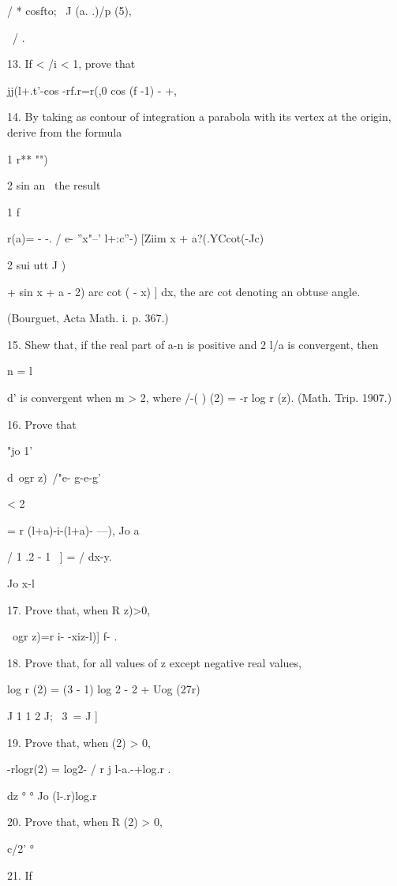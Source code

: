 / * cosfto; \ J (a. .)/p (5), 

\ / .

13. If < /i < 1, prove that

jj(l+.t'-cos -rf.r=r(,0 cos (f -1) - +,


14. By taking as contour of integration a parabola with its vertex at
the origin, derive from the formula

1 r** "")

2 sin an \ the result

1 f

r(a)= - -. / e- ''x"--' l+:c''-) [Ziim x + a?(.YCcot(-Jc)

2 sui utt J )

+ sin x + a - 2) arc cot ( - x) ] dx, the arc cot denoting an obtuse
angle.

(Bourguet, Acta Math. i. p. 367.)

15. Shew that, if the real part of a-n is positive and 2 l/a is
convergent, then

n = l

d' is convergent when m > 2, where \//-( ) (2) = -r log r (z). (Math.
Trip. 1907.)

16. Prove that

"jo 1'

d\ ogr z)\ /"e- g-e-g'

< 2

= r (l+a)-i-(l+a)- ---), Jo a

/ 1 .2 - 1 \ ] = / dx-y. 

Jo x-l

%
%

17. Prove that, when R z)>0,

\ ogr z)=r i- -xiz-l)] f- . 

18. Prove that, for all values of z except negative real values,

log r (2) = (3 - 1) log 2 - 2 + Uog (27r)

J 1 1 2 J; \ 3\ = J ]

19. Prove that, when (2) > 0,

-rlogr(2) = log2- / r j l-a.-+log.r .

dz ° ° Jo (l-.r)log.r

20. Prove that, when R (2) > 0,

c/2' °

21. If

